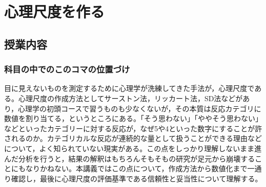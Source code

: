 \section{心理尺度を作る}
\subsection{授業内容}
\subsubsection{科目の中でのこのコマの位置づけ}
目に見えないものを測定するために心理学が洗練してきた手法が，心理尺度である。心理尺度の作成方法としてサーストン法，リッカート法，SD法などがあり，心理学の初頭コースで習うものも少なくないが，その本質は反応カテゴリに数値を割り当てる，というところにある。「そう思わない」「ややそう思わない」などといったカテゴリーに対する反応が，なぜ5や4といった数字にすることが許されるのか。カテゴリカルな反応が連続的な量として扱うことができる理由などについて，よく知られていない現実がある。この点をしっかり理解しないまま進んだ分析を行うと，結果の解釈はもちろんそもそもの研究が足元から崩壊することにもなりかねない。本講義ではこの点について，作成方法から数値化まで一通り確認し，最後に心理尺度の評価基準である信頼性と妥当性について理解する。
